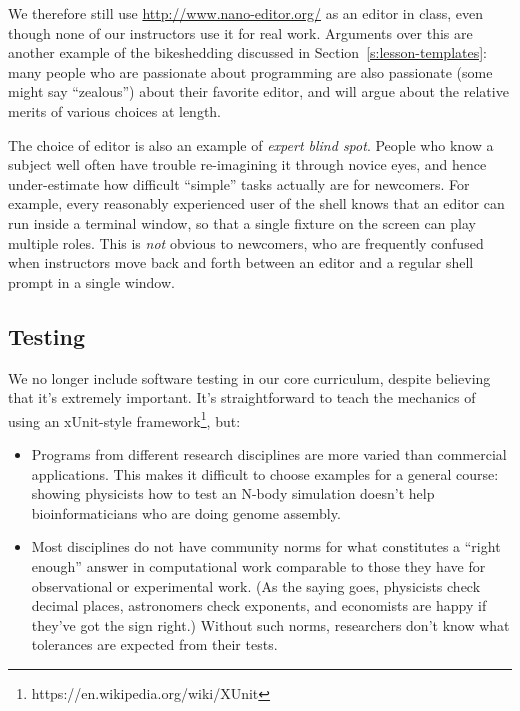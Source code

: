 \documentclass[10pt,a4paper,twocolumn]{article}
\begin{document}
We therefore still use \href{Nano}{http://www.nano-editor.org/} as an
editor in class, even though none of our instructors use it for real
work.  Arguments over this are another example of the bikeshedding
discussed in Section~\ref{s:lesson-templates}: many people who are
passionate about programming are also passionate (some might say
``zealous'') about their favorite editor, and will argue about the
relative merits of various choices at length.

The choice of editor is also an example of \emph{expert blind spot}.
People who know a subject well often have trouble re-imagining it
through novice eyes, and hence under-estimate how difficult ``simple''
tasks actually are for newcomers.  For example, every reasonably
experienced user of the shell knows that an editor can run inside a
terminal window, so that a single fixture on the screen can play
multiple roles.  This is \emph{not} obvious to newcomers, who are
frequently confused when instructors move back and forth between an
editor and a regular shell prompt in a single window.

\subsection{Testing}

We no longer include software testing in our core curriculum, despite
believing that it's extremely important. It's straightforward to teach
the mechanics of using an xUnit-style
framework\footnote{https://en.wikipedia.org/wiki/XUnit}, but:

\begin{itemize}

\item Programs from different research disciplines are more varied
  than commercial applications.  This makes it difficult to choose
  examples for a general course: showing physicists how to test an
  N-body simulation doesn't help bioinformaticians who are doing
  genome assembly.

\item Most disciplines do not have community norms for what
  constitutes a ``right enough'' answer in computational work
  comparable to those they have for observational or experimental
  work.  (As the saying goes, physicists check decimal places,
  astronomers check exponents, and economists are happy if they've got
  the sign right.)  Without such norms, researchers don't know what
  tolerances are expected from their tests.

\end{itemize}
\end{document}
